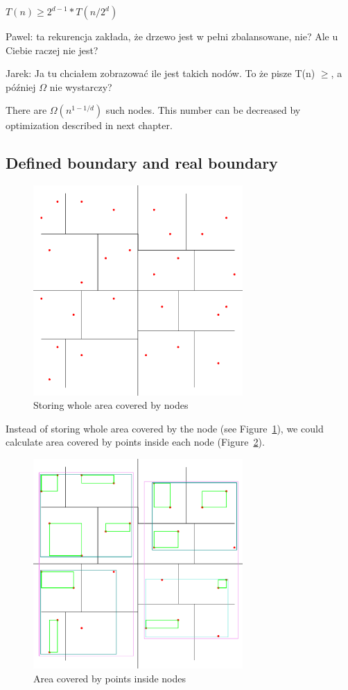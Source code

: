 \documentclass[10pt,a4paper]{article}
\newcommand{\pawel}[1]{\noindent\colorbox{myRed}{Pawel: #1}}
\newcommand{\jarek}[1]{\noindent\colorbox{myYellow}{Jarek: #1}}
\begin{document}
$T(n) \geq 2^{d-1} * T(n/2^{d})$

\pawel{ta rekurencja zakłada, że drzewo jest w pełni zbalansowane, nie? Ale u Ciebie raczej nie jest?}

\jarek{Ja tu chciałem zobrazować ile jest takich nodów. To że pisze T(n) $\geq$, a później $\Omega$ nie wystarczy?}
\bigskip

There are $\Omega (n^{1-1/d})$ such nodes. This number can be decreased by optimization described in next chapter.

\subsection{Defined boundary and real boundary}

\begin{figure}
\centering
  \includegraphics[width=8cm]{Figure1}
  \caption{Storing whole area covered by nodes}
  \label{fig:covered}
\end{figure}

Instead of storing whole area covered by the node (see Figure~\ref{fig:covered}), we could calculate area covered by points inside each node (Figure~\ref{fig:inside}).

\begin{figure}
\centering
  \includegraphics[width=8cm]{Figure2}
  \caption{Area covered by points inside nodes}
  \label{fig:inside}
\end{figure}
\end{document}
